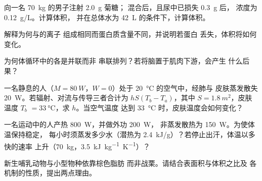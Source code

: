 \begin{exercise}[$\star\star$]\label{exo:b1:mammal-organization:5}
向一名 \qty{70}{kg} 的男子注射 \qty{2.0}{g} 菊糖；
混合后，且尿中已损失 \qty{0.3}{g} 后，
浓度为 \qty{0.12}{g/L}。计算体积，
并在总体水为 \qty{42}{L} 的条件下，计算体积。
\end{exercise}

\begin{exercise}[$\star\star$]\label{exo:b1:mammal-organization:6}
解释为何与的离子
组成相同而蛋白质含量不同，并说明若蛋白
丢失，体积将如何变化。
\end{exercise}

\begin{exercise}[$\star\star$]\label{exo:b1:mammal-organization:7}
为何体循环中的各是并联而非
串联排列？若将脑置于肌肉下游，会产生
什么后果？
\end{exercise}

\begin{exercise}[$\star\star$]\label{exo:b1:mammal-organization:8}
一名静息的人（$M = \qty{80}{W}$，$W = 0$）处于
\qty{20}{\celsius} 的空气中，经肺与
皮肤蒸发散失 \qty{20}{W}。若辐射、对流与传导三者合计为
$hS(T_b - T_a)$，其中 $S = \qty{1.8}{m^2}$，皮肤温度 $T_b$ $=
\qty{33}{\celsius}$，求 $h$。当空气温度
达到 \qty{33}{\celsius} 时，皮肤温度会如何变化？
\end{exercise}

\begin{exercise}[$\star\star$]\label{exo:b1:mammal-organization:9}
一名运动中的人产热 \qty{800}{W}，并做外功 \qty{200}{W}，
非蒸发散热为 \qty{150}{W}。为使体温保持稳定，
每小时须蒸发多少水（潜热为
\qty{2.4}{kJ/g}）？若停止出汗，体温以多快的速率
上升（\qty{70}{kg}，\qty{3.5}{kJ.kg^{-1}.K^{-1}}）？
\end{exercise}

\begin{exercise}[$\star\star\star$]\label{exo:b1:mammal-organization:10}
新生哺乳动物与小型物种依靠棕色脂肪
而非战栗。请结合表面积与体积之比及
各机制的性质，提出两点理由。
\end{exercise}


